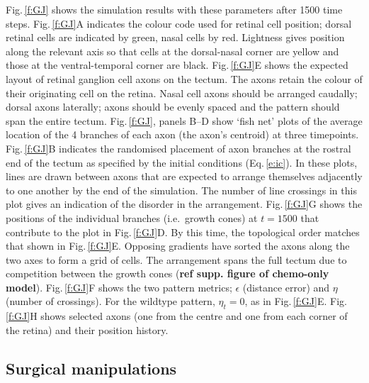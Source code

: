 \documentclass[11pt, a4paper]{article}
\begin{document}
Fig.\,\ref{f:GJ} shows the simulation results with these parameters after 1500 time steps.
Fig.\,\ref{f:GJ}A indicates the colour code used for retinal cell position; dorsal retinal cells are indicated by green, nasal cells by red. Lightness gives position along the relevant axis so that cells at the dorsal-nasal corner are yellow and those at the ventral-temporal corner are black.
Fig.\,\ref{f:GJ}E shows the expected layout of retinal ganglion cell axons on the tectum.
The axons retain the colour of their originating cell on the retina.
Nasal cell axons should be arranged caudally; dorsal axons laterally; axons should be evenly spaced and the pattern should span the entire tectum.
Fig.\,\ref{f:GJ}, panels B--D show `fish net' plots of the average location of the 4 branches of each axon (the axon's centroid) at three timepoints.
Fig.\,\ref{f:GJ}B indicates the randomised placement of axon branches at the rostral end of the tectum as specified by the initial conditions (Eq.\,\ref{e:ic}).
In these plots, lines are drawn between axons that are expected to arrange themselves adjacently to one another by the end of the simulation.
The number of line crossings in this plot gives an indication of the disorder in the arrangement.
Fig.\,\ref{f:GJ}G shows the positions of the individual branches (i.e.~growth cones) at $t=1500$ that contribute to the plot in Fig.\,\ref{f:GJ}D.
By this time, the topological order matches that shown in Fig.\,\ref{f:GJ}E.
Opposing gradients have sorted the axons along the two axes to form a grid of cells.
The arrangement spans the full tectum due to competition between the growth cones (\textbf{ref supp. figure of chemo-only model}).
Fig.\,\ref{f:GJ}F shows the two pattern metrics; $\epsilon$ (distance error) and $\eta$ (number of crossings).
For the wildtype pattern, $\eta_t=0$, as in Fig.\,\ref{f:GJ}E.
Fig.\,\ref{f:GJ}H shows selected axons (one from the centre and one from each corner of the retina) and their position history.

\subsection*{Surgical manipulations}
\end{document}
